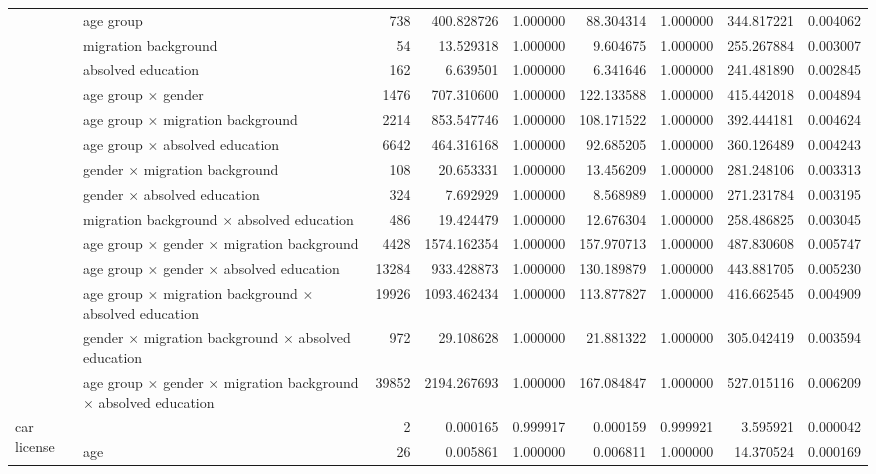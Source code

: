 \begin{tabular}{ll|r|rr|rr|rr}
 & age group & 738 & 400.828726 & 1.000000 & 88.304314 & 1.000000 & 344.817221 & 0.004062 \\
 & migration background & 54 & 13.529318 & 1.000000 & 9.604675 & 1.000000 & 255.267884 & 0.003007 \\
 & absolved education & 162 & 6.639501 & 1.000000 & 6.341646 & 1.000000 & 241.481890 & 0.002845 \\
 & age group $\times$ gender & 1476 & 707.310600 & 1.000000 & 122.133588 & 1.000000 & 415.442018 & 0.004894 \\
 & age group $\times$ migration background & 2214 & 853.547746 & 1.000000 & 108.171522 & 1.000000 & 392.444181 & 0.004624 \\
 & age group $\times$ absolved education & 6642 & 464.316168 & 1.000000 & 92.685205 & 1.000000 & 360.126489 & 0.004243 \\
 & gender $\times$ migration background & 108 & 20.653331 & 1.000000 & 13.456209 & 1.000000 & 281.248106 & 0.003313 \\
 & gender $\times$ absolved education & 324 & 7.692929 & 1.000000 & 8.568989 & 1.000000 & 271.231784 & 0.003195 \\
 & migration background $\times$ absolved education & 486 & 19.424479 & 1.000000 & 12.676304 & 1.000000 & 258.486825 & 0.003045 \\
 & age group $\times$ gender $\times$ migration background & 4428 & 1574.162354 & 1.000000 & 157.970713 & 1.000000 & 487.830608 & 0.005747 \\
 & age group $\times$ gender $\times$ absolved education & 13284 & 933.428873 & 1.000000 & 130.189879 & 1.000000 & 443.881705 & 0.005230 \\
 & age group $\times$ migration background $\times$ absolved education & 19926 & 1093.462434 & 1.000000 & 113.877827 & 1.000000 & 416.662545 & 0.004909 \\
 & gender $\times$ migration background $\times$ absolved education & 972 & 29.108628 & 1.000000 & 21.881322 & 1.000000 & 305.042419 & 0.003594 \\
 & age group $\times$ gender $\times$ migration background $\times$ absolved education & 39852 & 2194.267693 & 1.000000 & 167.084847 & 1.000000 & 527.015116 & 0.006209 \\
\cline{1-9}
\multirow[t]{2}{*}{car license} &  & 2 & 0.000165 & 0.999917 & 0.000159 & 0.999921 & 3.595921 & 0.000042 \\
 & age & 26 & 0.005861 & 1.000000 & 0.006811 & 1.000000 & 14.370524 & 0.000169 \\

\end{tabular}
